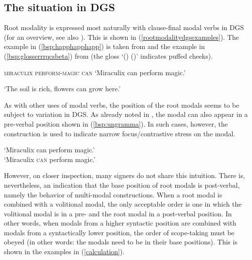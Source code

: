 \subsection{The situation in DGS}
\noindent Root modality is expressed most naturally with clause-final modal verbs in DGS (for an overview, see also \citealt{pfauquer2007syntaxofnegationandmodals}). This is shown in (\ref{rootmodalitydgsexamples}). The example in (\ref{bsp:happhapphapp}) is taken from \citet[359]{happ2014vork} and the example in (\ref{bsp:glosserrrqcsbeta}) from \citet[23]{bross2017scope} (the gloss `() ()' indicates puffed cheeks).

\begin{exe}
\ex\label{rootmodalitydgsexamples}\begin{xlist}
\ex\label{bsp:happhapphapp}
{}   
{\textsc{miraculix perform-magic can}}    
\glt `Miraculix can perform magic.' 

\ex\label{bsp:glosserrrqcsbeta}
  
\glt `The soil is rich, flowers can grow here.' 
\end{xlist}
\end{exe}

\noindent As with other uses of modal verbs, the position of the root modals seems to be subject to variation in DGS. As already noted in \citet[23]{bross2017scope}, the modal can also appear in a pre-verbal position shown in (\ref{bsp:ungramma}). In such cases, however, the construction is used to indicate narrow focus/contrastive stress on the modal.

\begin{exe}
   \label{bsp:ungramma} 
\glt *\phantom{\cmark} `Miraculix can perform magic.' \\
\cmark\phantom{*} `Miraculix \textsc{can} perform magic.'
\end{exe}

\noindent However, on closer inspection, many signers do not share this intuition. There is, nevertheless, an indication that the base position of root modals is post-verbal, namely the behavior of multi-modal constructions. When a root modal is combined with a volitional modal, the only acceptable order is one in which the volitional modal is in a pre- and the root modal in a post-verbal position. In other words, when modals from a higher syntactic position are combined with modals from a syntactically lower position, the order of scope-taking must be obeyed (in other words: the modals need to be in their base positions). This is shown in the examples in (\ref{calculation}).

